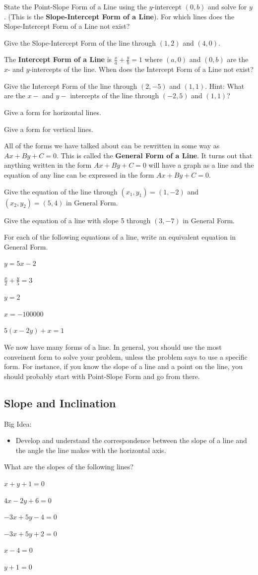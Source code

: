 \bq State the Point-Slope Form of a Line using the $y$-intercept $(0,b)$ and solve for $y$. (This is the \textbf{Slope-Intercept Form of a Line}). For which lines does the Slope-Intercept Form of a Line not exist?
\eq

\bq Give the Slope-Intercept Form of the line through $(1,2)$ and $(4,0)$.
\eq

\bq The \textbf{Intercept Form of a Line} is $\frac{x}{a}+\frac{y}{b} =1$ where $(a,0)$ and $(0,b)$ are the $x$- and $y$-intercepts of the line. When does the Intercept Form of a Line not exist?
\eq

\bq Give the Intercept Form of the line through $(2,-5)$ and $(1,1)$. Hint: What are the $x-$ and $y-$ intercepts of the line through $(-2,5)$ and $(1,1)$?
\eq

\bq Give a form for horizontal lines.
\eq

\bq\label{q15} Give a form for vertical lines.
\eq

\begin{info} All of the forms we have talked about can be rewritten in some way as $ Ax+By+C=0$. This is called the \textbf{General Form of a Line}. It turns out that anything written in the form $ Ax+By+C=0$ will have a graph as a line and the equation of any line can be expressed in the form $ Ax+By+C=0$.  \end{info}

\question Give the equation of the line through $(x_1,y_1)=(1,-2)$ and $(x_2,y_2) = (5,4)$ in General Form.

\question Give the equation of a line with slope 5 through $(3,-7)$ in General Form.

\bq For each of the following equations of a line, write an equivalent equation in General Form.
\be
\item $y=5x-2$
\item $ \frac{x}{2}+\frac{y}{5}=3$
\item $y=2$
\item $x=-100000$
\item $5(x-2y)+x=1$
\ee
\eq

We now have many forms of a line. In general, you should use the most conveinent form to solve your problem, unless the problem says to use a specific form. For instance, if you know the slope of a line and a point on the line, you should probably start with Point-Slope Form and go from there.
\subsection{Slope and Inclination}
Big Idea:
\begin{itemize}
\item Develop and understand the correspondence between the slope of a line and the angle the line makes with the horizontal axis.
\end{itemize}
\bq What are the slopes of the following lines?
\be
\item $x+y+1=0$
\item $4x-2y+6=0$
\item $-3x+5y-4=0$
\item $-3x+5y+2=0$
\item $x-4=0$
\item $y+1=0$
\ee
\eq

